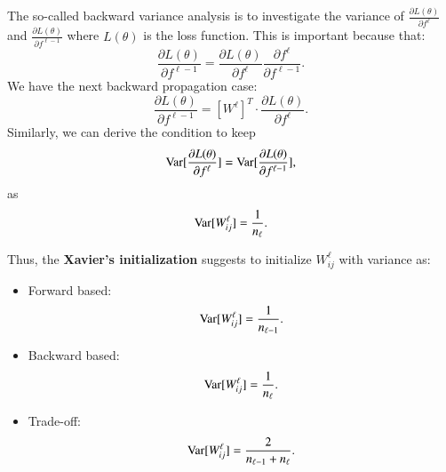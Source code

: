 The so-called backward variance analysis is to investigate the variance of $\frac{\partial L(\theta)}{\partial f^\ell}$ and $\frac{\partial L(\theta)}{\partial f^{\ell-1}}$
where $L(\theta)$ is the loss function.
This is important because that:
\begin{equation}\label{key}
\frac{\partial L(\theta)}{\partial f^{\ell-1}} = \frac{\partial L(\theta)}{\partial f^\ell} \frac{\partial f^\ell}{\partial f^{\ell-1}}.
\end{equation}
We have the next backward propagation case:
\begin{equation}\label{key}
\frac{\partial L(\theta)}{\partial f^{\ell-1}} = [W^\ell]^T \cdot \frac{\partial L(\theta)}{\partial f^\ell}.
\end{equation}
Similarly, we can derive the condition to keep 
\begin{equation}\label{key}
{\rm Var}[ \frac{\partial L(\theta)}{\partial f^\ell}] = {\rm Var} [ \frac{\partial L(\theta)}{\partial f^{\ell-1}}],
\end{equation}
as
\begin{equation}\label{key}
{\rm Var}[W^\ell_{ij}] = \frac{1}{n_{\ell}}.
\end{equation}

Thus, the {\bf Xavier's initialization} suggests to initialize $W^\ell_{ij}$ with variance as:
\begin{itemize}
	\item Forward based:
	\begin{equation}\label{key}
	{\rm Var}[W^\ell_{ij}] = \frac{1}{n_{\ell-1}}.
	\end{equation}
	\item Backward based:
	\begin{equation}\label{key}
	{\rm Var}[W^\ell_{ij}] = \frac{1}{n_{\ell}}.
	\end{equation}
	\item Trade-off: 
	\begin{equation}\label{key}
	{\rm Var}[W^\ell_{ij}] = \frac{2}{n_{\ell-1} + n_\ell}.
	\end{equation}
\end{itemize}
\fi


